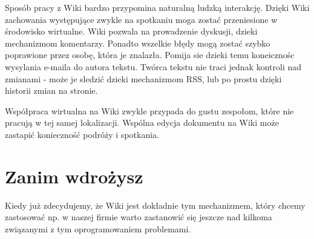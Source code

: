 \documentclass{article}
\begin{document}



		Sposób pracy z Wiki bardzo przypomina naturalną ludzką interakcję. Dzięki Wiki zachowania występujące zwykle na spotkaniu moga zostać przeniesione w środowisko wirtualne. Wiki pozwala na prowadzenie dyskusji, dzieki mechanizmom komentarzy. Ponadto wszelkie błędy mogą zostać szybko poprawione przez osobę, która je znalazła. Pomija sie dzieki temu koneicznośc wysylania e-maila do autora tekstu. Twórca tekstu nie traci jednak kontroli nad zmianami - może je sledzić dzieki mechanizmom RSS, lub po prostu dzięki historii zmian na stronie.

		Współpraca wirtualna na Wiki zwykle przypada do gustu zespołom, które nie pracują w tej samej lokalizacji. Wspólna edycja dokumentu na Wiki może zastapić konieczność podróży i spotkania. 




\newpage
\section{Zanim wdrożysz}
Kiedy już zdecydujemy, że Wiki jest dokładnie tym mechanizmem, który chcemy zastosować np. w naszej firmie warto zastanowić się jeszcze nad kilkoma związanymi z tym oprogramowaniem problemami.
\end{document}
